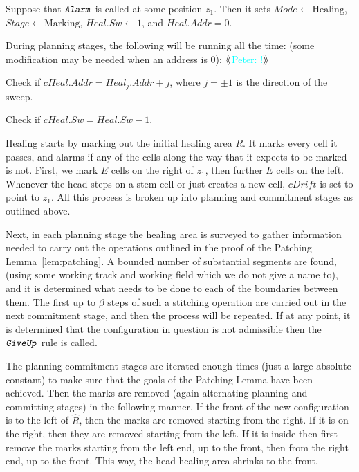 \documentclass[12pt]{memoir}
\newcommand{\authnote}[3]
{{ \textcolor{#3}{$\langle\hspace{-0.2em}\langle$\textsf{\footnotesize #1: #2}$\rangle\hspace{-0.2em}\rangle$}}}
\newcommand{\authnote}[2]{}
\newcommand{\Pnote}[1]{{\authnote{Peter}{#1}{cyan}}}
\newcommand{\fld}[1]{\ensuremath{\textit{#1}}}
\newcommand{\rul}[1]{\ensuremath{\texttt{\slshape #1\/}}}
\newcommand{\E}{E}
\newcommand{\R}{R}
\newcommand{\Addr}{\fld{Addr}}
\newcommand{\cDrift}{\fld{cDrift}}
\newcommand{\Mode}{\fld{Mode}}
\newcommand{\Heal}{\fld{Heal}}
\newcommand{\cHeal}{\fld{cHeal}}
\newcommand{\Stage}{\fld{Stage}}
\newcommand{\Sweep}{\fld{Sw}}
\newcommand{\Marking}{\mathrm{Marking}}
\newcommand{\Healing}{\mathrm{Healing}}
\newcommand{\Alarm}{\rul{Alarm}}
\newcommand{\GiveUp}{\rul{GiveUp}}
\begin{document}
Suppose that \( \Alarm \) is called at some position \( z_{1} \).
Then it sets  \( \Mode\gets\Healing \),  \( \Stage\gets\Marking \),
\( \Heal.\Sweep \gets 1 \), and \( \Heal.\Addr = 0 \).

During planning stages, the following  will be running
all the time: (some modification may be needed when an address is 0): \Pnote{!}
        \begin{bullets}
                  \item Check if \( \cHeal.\Addr = \Heal_{j}.\Addr + j \), where
                        \( j = \pm 1 \) is the direction of the sweep.
                  \item 
                        Check if \( \cHeal.\Sweep = \Heal.\Sweep -1 \).
              \end{bullets}

  Healing starts by marking out the initial healing area \( \R \).
  It marks every cell it passes, and alarms if any of the cells
  along the way that it expects to be marked is not.
  First, we mark \( \E \) cells on the right of \( z_{1} \), then further \( \E \) cells on the left.
  Whenever the head steps on a stem cell or just creates a new cell, 
  \( \cDrift \) is set to point to \( z_{1} \).
  All this process is broken up into planning and commitment stages as outlined above.

Next, in each planning stage 
the healing area is surveyed to gather information needed to carry out the
operations outlined in the proof of the Patching Lemma~\ref{lem:patching}.
A bounded number of substantial segments are found, (using some working track and working
field which we do not give a name to), and it is determined what needs to be done
to each of the boundaries between them.
The first up to \( \beta \) steps of such a stitching operation are carried out in the
next commitment stage, and then the process will be repeated.
If at any point, it is determined that the configuration in question is not admissible
then the \( \GiveUp \) rule is called.

The planning-commitment stages are iterated enough times (just a large absolute constant)
to make sure that the goals of the Patching Lemma have been
achieved.
Then the marks are removed (again alternating planning and committing stages)
in the following manner.
If the front of the new configuration is to the left of \( \hat R \), then the marks 
are removed starting from the right.
If it is on the right, then they are removed starting from the left.
If it is inside then first remove the marks starting from the left end, up to the front, 
then from the right end, up to the front.
This way, the head healing area shrinks to the front.
\end{document}
